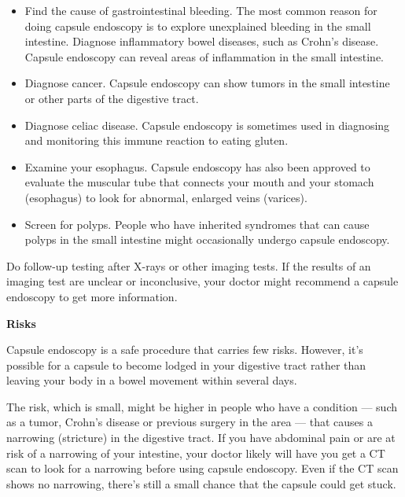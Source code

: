 \documentclass[12pt]{article}
\begin{document}
\begin{itemize}


\item Find the cause of gastrointestinal bleeding. The most common reason for doing capsule endoscopy is to explore unexplained bleeding in the small intestine.
Diagnose inflammatory bowel diseases, such as Crohn's disease. Capsule endoscopy can reveal areas of inflammation in the small intestine.\\
\item Diagnose cancer. Capsule endoscopy can show tumors in the small intestine or other parts of the digestive tract.\\
\item Diagnose celiac disease. Capsule endoscopy is sometimes used in diagnosing and monitoring this immune reaction to eating gluten.\\
\item Examine your esophagus. Capsule endoscopy has also been approved to evaluate the muscular tube that connects your mouth and your stomach (esophagus) to look for abnormal, enlarged veins (varices).\\
\item Screen for polyps. People who have inherited syndromes that can cause polyps in the small intestine might occasionally undergo capsule endoscopy.\\

\end{itemize}
Do follow-up testing after X-rays or other imaging tests. If the results of an imaging test are unclear or inconclusive, your doctor might recommend a capsule endoscopy to get more information.


\LARGE\flushleft\textbf{Risks}

\large\flushleft Capsule endoscopy is a safe procedure that carries few risks. However, it's possible for a capsule to become lodged in your digestive tract rather than leaving your body in a bowel movement within several days.

The risk, which is small, might be higher in people who have a condition — such as a tumor, Crohn's disease or previous surgery in the area — that causes a narrowing (stricture) in the digestive tract. If you have abdominal pain or are at risk of a narrowing of your intestine, your doctor likely will have you get a CT scan to look for a narrowing before using capsule endoscopy. Even if the CT scan shows no narrowing, there's still a small chance that the capsule could get stuck.
\end{document}
